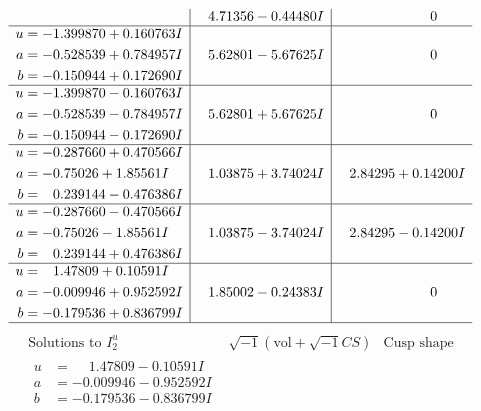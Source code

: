 \documentclass[1p]{elsarticle_modified}
\theoremstyle{definition}
\newcommand{\I}{\sqrt{-1}}
\begin{document}
$$\begin{array}{c|c|c}
 & \phantom{-}4.71356 - 0.44480 I & \phantom{-0.000000 } 0 \\ \hline\begin{aligned}
u &= -1.399870 + 0.160763 I \\
a &= -0.528539 + 0.784957 I \\
b &= -0.150944 + 0.172690 I\end{aligned}
 & \phantom{-}5.62801 - 5.67625 I & \phantom{-0.000000 } 0 \\ \hline\begin{aligned}
u &= -1.399870 - 0.160763 I \\
a &= -0.528539 - 0.784957 I \\
b &= -0.150944 - 0.172690 I\end{aligned}
 & \phantom{-}5.62801 + 5.67625 I & \phantom{-0.000000 } 0 \\ \hline\begin{aligned}
u &= -0.287660 + 0.470566 I \\
a &= -0.75026 + 1.85561 I \\
b &= \phantom{-}0.239144 - 0.476386 I\end{aligned}
 & \phantom{-}1.03875 + 3.74024 I & \phantom{-}2.84295 + 0.14200 I \\ \hline\begin{aligned}
u &= -0.287660 - 0.470566 I \\
a &= -0.75026 - 1.85561 I \\
b &= \phantom{-}0.239144 + 0.476386 I\end{aligned}
 & \phantom{-}1.03875 - 3.74024 I & \phantom{-}2.84295 - 0.14200 I \\ \hline\begin{aligned}
u &= \phantom{-}1.47809 + 0.10591 I \\
a &= -0.009946 + 0.952592 I \\
b &= -0.179536 + 0.836799 I\end{aligned}
 & \phantom{-}1.85002 - 0.24383 I & \phantom{-0.000000 } 0\\
 \hline 
 \end{array}$$\newpage$$\begin{array}{c|c|c}  
\text{Solutions to }I^u_{2}& \I (\text{vol} + \sqrt{-1}CS) & \text{Cusp shape}\\
 \hline 
\begin{aligned}
u &= \phantom{-}1.47809 - 0.10591 I \\
a &= -0.009946 - 0.952592 I \\
b &= -0.179536 - 0.836799 I\end{aligned}

\end{array}$$
\end{document}
